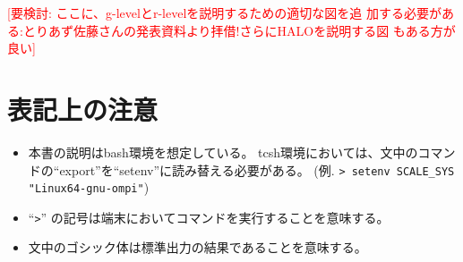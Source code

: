 \textcolor{red}{[要検討: ここに、g-levelとr-levelを説明するための適切な図を追
    加する必要がある:とりあず佐藤さんの発表資料より拝借!さらにHALOを説明する図
    もある方が良い]}


\section{表記上の注意}
 \begin{itemize}
   \item 本書の説明はbash環境を想定している。
         tcsh環境においては、文中のコマンドの``export''を``setenv''に読み替える必要がある。
         (例. \verb|> setenv SCALE_SYS "Linux64-gnu-ompi"|)
   \item ``\verb|>|'' の記号は端末においてコマンドを実行することを意味する。
   \item 文中のゴシック体は標準出力の結果であることを意味する。
 \end{itemize}

